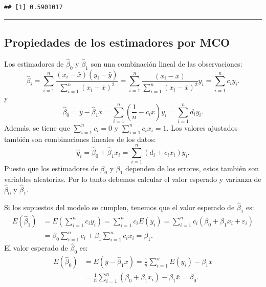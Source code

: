 \documentclass[
]{article}
\begin{document}
\begin{verbatim}
## [1] 0.5901017
\end{verbatim}

\rule{\textwidth}{0.4pt}

\hypertarget{propiedades-de-los-estimadores-por-mco}{%
\subsection{Propiedades de los estimadores por MCO}\label{propiedades-de-los-estimadores-por-mco}}

Los estimadores de \(\widehat{\beta}_{0}\) y \(\widehat{\beta}_{1}\) son una combinación lineal de las observaciones:
\begin{equation}
\widehat{\beta}_{i} = \sum_{i=1}^{n} \frac{(x_{i}-\bar{x})(y_{i}-\bar{y})}{\sum_{i=1}^{n}(x_{i}-\bar{x})^2} = \sum_{i=1}^{n} \frac{(x_{i}-\bar{x})}{\sum_{i=1}^{n}(x_{i}-\bar{x})^2}y_{i} = \sum_{i=1}^{n}c_{i}y_{i}.
\label{eq:beta1cl}
\end{equation}
y
\[
\widehat{\beta}_{0} = \bar{y} - \widehat{\beta}_{1}\bar{x} = \sum_{i=1}^{n}\left( \frac{1}{n} - c_{i}\bar{x} \right)y_{i} = \sum_{i=1}^{n}d_{i}y_{i}.
\]
Además, se tiene que \(\sum_{i=1}^{n}c_{i}=0\) y \(\sum_{i=1}^{n}c_{i}x_{i}=1\). Los valores ajustados también son combinaciones lineales de los datos:
\[
\widehat{y}_{i} = \widehat{\beta}_{0} + \widehat{\beta}_{1}x_{i} = \sum_{i=1}^{n}(d_{i}+c_{i}x_{i})y_{i}.
\]
Puesto que los estimadores de \(\beta_{0}\) y \(\beta_{1}\) dependen de los errores, estos también son variables aleatorias. Por lo tanto debemos calcular el valor esperado y varianza de \(\widehat{\beta}_{0}\) y \(\widehat{\beta}_{1}\).

Si los supuestos del modelo se cumplen, tenemos que el valor esperado de \(\widehat{\beta}_{1}\) es:
\begin{equation}
\begin{split}
E(\widehat{\beta}_{1}) &= E\left( \sum_{i=1}^{n}c_{i}y_{i} \right) = \sum_{i=1}^{n}c_{i}E(y_{i}) = \sum_{i=1}^{n} c_{i}(\beta_{0} + \beta_{1}x_{i} + \varepsilon_{i}) \\
&=\beta_{0}\sum_{i=1}^{n}c_{i} + \beta_{1}\sum_{i=1}^{n}c_{i}x_{i} = \beta_{1}.
\end{split}
\nonumber
\end{equation}
El valor esperado de \(\widehat{\beta}_{0}\) es:
\begin{equation}
\begin{split}
E(\widehat{\beta}_{0}) &= E\left(\bar{y} - \widehat{\beta}_{1}\bar{x} \right) = \frac{1}{n}\sum_{i=1}^{n}E(y_{i}) - \beta_{1}\bar{x} \\
&= \frac{1}{n}\sum_{i=1}^{n}\left(\beta_{0} + \beta_{1}x_{i}\right) - \beta_{1}\bar{x} = \beta_{0}.
\end{split}
\nonumber
\end{equation}
\end{document}
